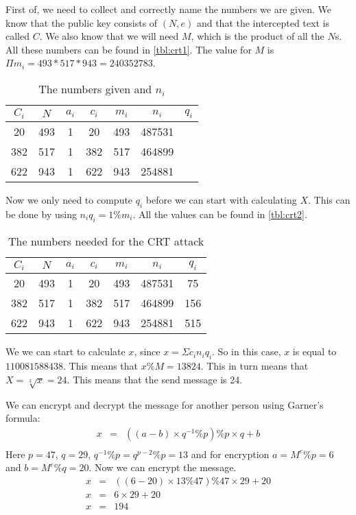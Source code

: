 First of, we need to collect and correctly name the numbers we are given. We know that the public key consists of $(N,e)$ and that the intercepted text is called $C$. We also know that we will need $M$, which is the product of all the $N$s. All these numbers can be found in \autoref{tbl:crt1}. The value for $M$ is $\Pi m_i = 493 * 517 * 943 = 240352783$.

\begin{table}[!htp]
\centering
\caption{The numbers given and $n_i$}
\label{tbl:crt1}
\begin{tabular}{|ccccccc|}
\hline
$C_i$ & $N$ & $a_i$ & $c_i$ & $m_i$ & $n_i$  & $q_i$ \\ \hline
   20 & 493 &     1 &    20 &   493 & 487531 &       \\
  382 & 517 &     1 &   382 &   517 & 464899 &       \\
  622 & 943 &     1 &   622 &   943 & 254881 &       \\ \hline
\end{tabular}
\end{table}

Now we only need to compute $q_i$ before we can start with calculating $X$. This can be done by using $n_iq_i = 1 \% m_i$. All the values can be found in \autoref{tbl:crt2}.

\begin{table}[!htp]
\centering
\caption{The numbers needed for the CRT attack}
\label{tbl:crt2}
\begin{tabular}{|ccccccc|}
\hline
$C_i$ & $N$ & $a_i$ & $c_i$ & $m_i$ & $n_i$  & $q_i$ \\ \hline
   20 & 493 &     1 &    20 &   493 & 487531 &    75 \\
  382 & 517 &     1 &   382 &   517 & 464899 &   156 \\
  622 & 943 &     1 &   622 &   943 & 254881 &   515 \\ \hline
\end{tabular}
\end{table}

We we can start to calculate $x$, since $x=\Sigma c_in_iq_i$. So in this case, $x$ is equal to $110081588438$. This means that $x\%M = 13824$. This in turn means that $X = \sqrt[3]{x} = 24$. This means that the send message is 24. 

We can encrypt and decrypt the message for another person using Garner's formula:
\begin{eqnarray}
x &=& ((a - b) \times q^{-1} \% p) \% p \times q + b\\
\end{eqnarray}
Here $p = 47$, $q = 29$, $q^{-1} \%p = q^{p-2} \% p = 13$ and for encryption $a = M^e \% p = 6$ and $b = M^e \% q = 20$. Now we can encrypt the message. 
\begin{eqnarray}
x &=& ((6 - 20) \times 13 \% 47) \% 47 \times 29 + 20 \\
x &=& 6 \times 29 + 20 \\
x &=& 194 \\
\end{eqnarray}

